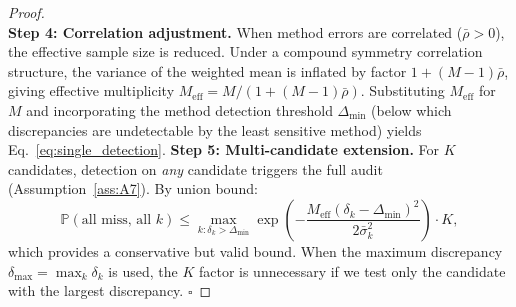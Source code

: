 \documentclass[11pt,a4paper]{article}
\theoremstyle{definition}
\newcommand{\Pbb}{\mathbb{P}}
\begin{document}
\begin{proof}
\begin{equation}
    \label{eq:hoeffding}
\end{equation}
\textbf{Step 4: Correlation adjustment.} When method errors are correlated ($\bar{\rho} > 0$), the effective sample size is reduced. Under a compound symmetry correlation structure, the variance of the weighted mean is inflated by factor $1 + (M-1)\bar{\rho}$, giving effective multiplicity $M_{\text{eff}} = M / (1 + (M-1)\bar{\rho})$. Substituting $M_{\text{eff}}$ for $M$ and incorporating the method detection threshold $\Delta_{\min}$ (below which discrepancies are undetectable by the least sensitive method) yields Eq.~\eqref{eq:single_detection}.
\textbf{Step 5: Multi-candidate extension.} For $K$ candidates, detection on \textit{any} candidate triggers the full audit (Assumption~\ref{ass:A7}). By union bound:
\begin{equation}
    \Pbb(\text{all miss, all } k) \leq \max_{k: \delta_k > \Delta_{\min}} \exp\left(-\frac{M_{\text{eff}} (\delta_k - \Delta_{\min})^2}{2\bar{\sigma}_k^2}\right) \cdot K,
    \label{eq:multi_candidate}
\end{equation}
which provides a conservative but valid bound. When the maximum discrepancy $\delta_{\max} = \max_k \delta_k$ is used, the $K$ factor is unnecessary if we test only the candidate with the largest discrepancy. $\square$
\end{proof}
\end{document}
